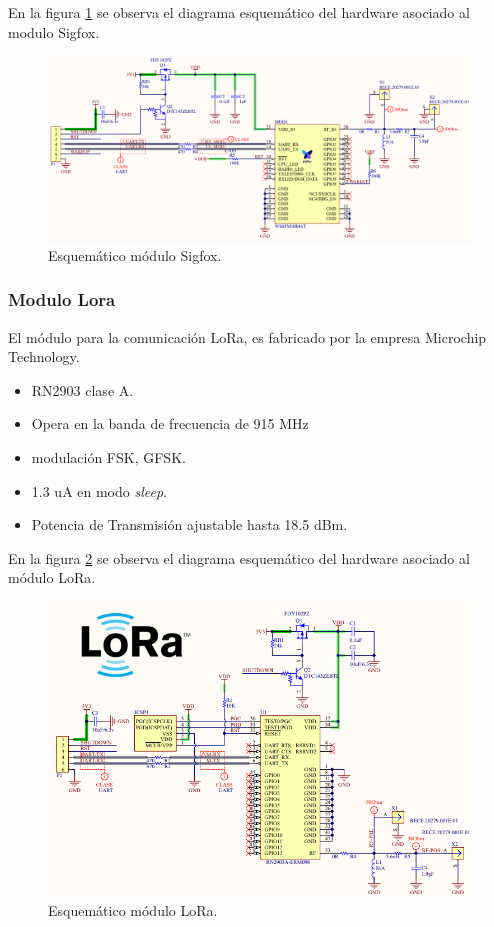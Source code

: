 En la figura \ref{fig:SIGFOX_SCH} se observa el diagrama esquemático del hardware asociado al modulo Sigfox.

\begin{figure}[h]
	\centering
	\includegraphics[scale=.4]{./Figures/SIGFOX_SCH.PNG}
	\caption{Esquemático módulo Sigfox.}
	\label{fig:SIGFOX_SCH}
\end{figure}

\subsubsection{Modulo Lora}
El módulo para la comunicación LoRa, es fabricado por la empresa  Microchip Technology.
\begin{itemize}
    \item  RN2903 \protect\footnotemark  clase A.
    \item Opera en la banda de frecuencia de 915 MHz
    \item modulación FSK, GFSK.
    \item 1.3 uA en modo \textit{sleep}.
    \item Potencia de Transmisión ajustable hasta 18.5 dBm.
\end{itemize}

En la figura \ref{fig:lORA_SCH} se observa el diagrama esquemático del hardware asociado al módulo LoRa.

\begin{figure}[h]
	\centering
	\includegraphics[scale=.55]{./Figures/lORA_SCH.PNG}
	\caption{Esquemático módulo LoRa.}
	\label{fig:lORA_SCH}
\end{figure}

